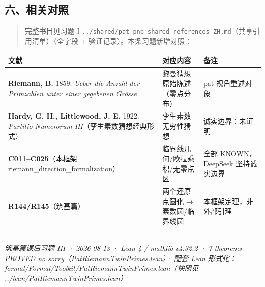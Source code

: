 \documentclass[
]{article}
\newcounter{none} %
\begin{document}
\subsection{六、相关对照}\label{ux516dux76f8ux5173ux5bf9ux7167}

\begin{quote}
完整书目见习题 I
\texttt{../shared/pat\_pnp\_shared\_references\_ZH.md}（共享引用清单）（全字段
+ 验证记录）。本条习题新增对照：
\end{quote}

{\def\LTcaptype{none} %
\begin{longtable}[]{@{}
  >{\raggedright\arraybackslash}p{}
  >{\raggedright\arraybackslash}p{}
  >{\raggedright\arraybackslash}p{}@{}}
\toprule\noalign{}
\begin{minipage}[b]{\linewidth}\raggedright
文献
\end{minipage} & \begin{minipage}[b]{\linewidth}\raggedright
对应内容
\end{minipage} & \begin{minipage}[b]{\linewidth}\raggedright
备注
\end{minipage} \\
\midrule\noalign{}
\endhead
\bottomrule\noalign{}
\endlastfoot
\textbf{Riemann, B.} 1859. \emph{Ueber die Anzahl der Primzahlen unter
einer gegebenen Grösse} & 黎曼猜想原始陈述（零点分布） & pat
视角重述对象 \\
\textbf{Hardy, G. H., Littlewood, J. E.} 1922. \emph{Partitio Numerorum
III}（孪生素数猜想经典形式） & 孪生素数无穷性猜想 & 诚实边界：未证明 \\
\textbf{C011--C025}（本框架 riemann\_direction\_formalization） &
临界线几何/欧拉乘积/无零点区 & 全部 KNOWN，DeepSeek 坚持诚实边界 \\
\textbf{R144/R145}（筑基篇） & 两个还原点圆化 → 素数圆/临界线圆 &
本框架定理，非外部引理 \\
\end{longtable}
}

\begin{center}\rule{0.5\linewidth}{0.5pt}\end{center}

\emph{筑基篇课后习题 III · 2026-08-13 · Lean 4 / mathlib v4.32.2 · 7
theorems PROVED no sorry（PatRiemannTwinPrimes.lean）· 配套 Lean
形式化：formal/Formal/Toolkit/PatRiemannTwinPrimes.lean（快照见
../lean/PatRiemannTwinPrimes.lean）}
\end{document}
